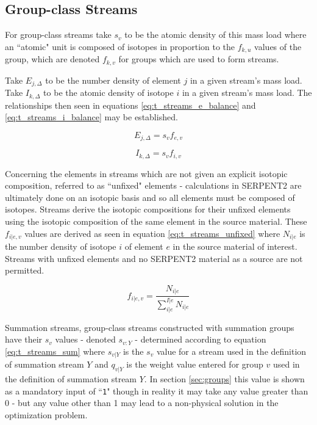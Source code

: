 \subsection{Group-class Streams}\label{ssec:t_streams}
For group-class streams take $s_{v}$ to be the atomic density of this mass
load where an ``atomic" unit is composed of isotopes in proportion to the
$f_{k,u}$ values of the group, which are denoted $f_{k,v}$ for groups which
are used to form streams. 

Take $E_{j,\Delta}$ to be the number density of element $j$ in a given stream's
mass load. Take $I_{k,\Delta}$ to be the atomic density of isotope $i$ in a 
given stream's mass load. The relationships then seen in equations 
\ref{eq:t_streams_e_balance} and \ref{eq:t_streams_i_balance} may be 
established.

\begin{equation}\label{eq:t_streams_e_balance}
E_{j,\Delta} = s_{v}f_{e,v} 
\end{equation}

\begin{equation}\label{eq:t_streams_i_balance}
I_{k,\Delta} = s_{v}f_{i,v} 
\end{equation}

Concerning the elements in streams which are not given an explicit isotopic
composition, referred to as ``unfixed" elements - calculations in SERPENT2 are 
ultimately done on an isotopic basis
and so all elements must be composed of isotopes. Streams 
derive the isotopic compositions for their unfixed elements using the 
isotopic composition of the same element in the source material. These
$f_{i|e,v}$ values are derived as seen in equation \ref{eq:t_streams_unfixed}
where $N_{i|e}$ is the number density of isotope $i$ of element $e$ in the 
source material of interest. Streams with unfixed elements and no SERPENT2
material as a source are not permitted.

\begin{equation}\label{eq:t_streams_unfixed}
f_{i|e,v} = \frac{N_{i|e}}{\sum_{i|e}^{I|e} N_{i|e}}
\end{equation}

Summation streams, group-class streams constructed with summation
groups have their $s_{v}$ values - denoted $s_{v:Y}$ - determined 
according to equation \ref{eq:t_streams_sum} where $s_{v|Y}$ is the $s_{v}$ 
value for a stream used in the definition of summation stream $Y$ and $q_{v|Y}$
is the weight value entered for group $v$ used in the definition of summation
stream $Y$. In section \ref{sec:groups} this value is shown as a mandatory input
of ``\texttt{1}" though in reality it may take any value greater than 0 - but
any value other than 1 may lead to a non-physical solution in the optimization
problem. 

